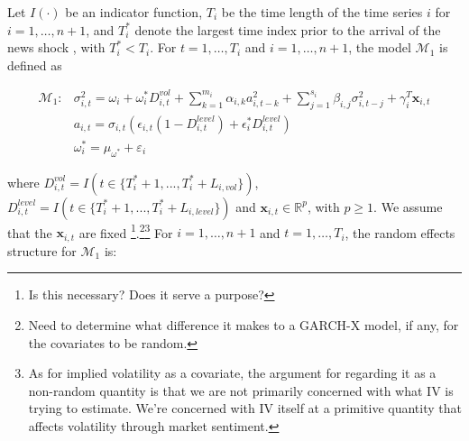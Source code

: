 \documentclass[11pt]{article}
\newcommand{\R}{\mathbb{R}}
\newcommand{\x}{\textbf{x}}
\def\mbf#1{\mathbf{#1}} %
\def\mc#1{\mathcal{#1}} %
\def\mc#1{\mathcal{#1}}
\theoremstyle{definition}
\begin{document}
Let $I(\cdot)$ be an indicator function, $T_i$ be the time length of the time series $i$ for $i = 1, \ldots, n+1$, and $T_i^*$ denote the largest time index prior to the arrival of the news shock , with $T_i^* < T_i$.  For $t= 1, \ldots, T_i$ and $i = 1, \ldots, n+1$, the model $\mc{M}_1$ is defined as

\begin{align}
\mc{M}_1 \colon &\sigma^{2}_{i,t} = \omega_{i} + \omega^{*}_i D^{vol}_{i,t} + \sum^{m_{i}}_{k=1}\alpha_{i,k}a^{2}_{i,t-k} + \sum_{j=1}^{s_{i}}\beta_{i,j}\sigma_{i,t-j}^{2} + \gamma_{i}^{T} \x_{i,t}\\
&a_{i,t} = \sigma_{i,t}(\epsilon_{i,t}(1-D^{level}_{i,t}) + \epsilon^{*}_{i}D^{level}_{i,t})\\ 
&\omega_i^{*} = \mu_{\omega^{*}} + \varepsilon_{i} \label{model1}
\end{align}

 where $D^{vol}_{i,t} = I(t \in \{T_i^* + 1,...,T_i^* + L_{i, vol}\})$, $D^{level}_{i,t} = I(t \in \{T_i^* + 1,...,T_i^* + L_{i, level}\})$ 
and $\x_{i,t} \in \R^{p}$, with $p \geq 1$.  We assume that the 
$\mbf{x}_{i,t}$ are fixed \footnote{Is this necessary?  Does it serve a purpose?}.\footnote{Need to determine what difference it makes to a GARCH-X model, if any, for the covariates to be random.}\footnote{As for implied volatility as a covariate, the argument for regarding it as a non-random quantity is that we are not primarily concerned with what IV is trying to estimate.  We're concerned with IV itself at a primitive quantity that affects volatility through market sentiment.}  For $i = 1, \ldots, n+1$ and $t=1, \ldots, T_i$, the random effects structure for $\mc{M}_1$ is:
\end{document}
